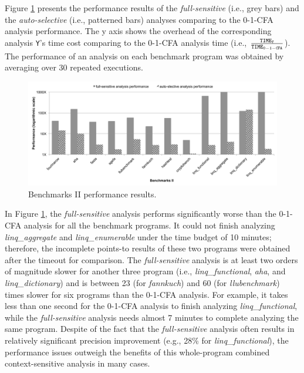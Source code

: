 Figure \ref{fig:b2-performance} presents the performance results of the {\it full-sensitive} (i.e., grey bars) and the {\it auto-selective} (i.e., patterned bars) analyses comparing to the 0-1-CFA analysis performance. The y axis shows the overhead of the corresponding analysis {\tt Y}'s time cost comparing to the 0-1-CFA analysis time (i.e., ${\tt \frac{TIME_{Y}}{TIME_{0-1-CFA}}}$). The performance of an analysis on each benchmark program was obtained by averaging over 30 repeated executions.

\begin{figure}[th!]
        \includegraphics[width=2\columnwidth]{b2-performance}
\caption{\textmd{Benchmarks II performance results.}}
\vspace{-6pt}
\label{fig:b2-performance}
\end{figure}

In Figure \ref{fig:b2-performance}, the {\it full-sensitive} analysis performs significantly worse than the 0-1-CFA analysis for all the benchmark programs. It could not finish analyzing {\it linq\_aggregate} and {\it linq\_enumerable} under the time budget of 10 minutes; therefore, the incomplete points-to results of these two programs were obtained after the timeout for comparison. The {\it full-sensitive} analysis is at least two orders of magnitude slower for another three program (i.e.,  {\it linq\_functional}, {\it aha}, and {\it linq\_dictionary}) and is between 23 (for {\it fannkuch}) and 60 (for {\it llubenchmark}) times slower for six programs than the 0-1-CFA analysis. For example, it takes less than one second for the 0-1-CFA analysis to finish analyzing {\it linq\_functional}, while the {\it full-sensitive} analysis needs almost 7 minutes to complete analyzing the same program. Despite of the fact that the {\it full-sensitive} analysis often results in relatively significant precision improvement (e.g., 28\% for {\it linq\_functional}), the performance issues outweigh the benefits of this whole-program combined context-sensitive analysis in many cases.

